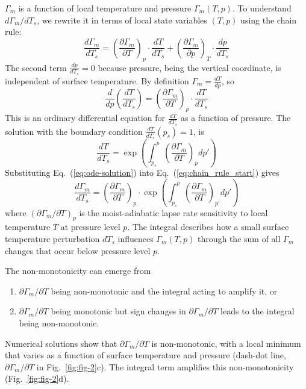 \documentclass[draft]{ametsocV6.1}
\begin{document}
$\Gamma_m$ is a function of local temperature and pressure $\Gamma_m(T, p)$. To understand $d\Gamma_m/dT_s$, we rewrite it in terms of local state variables $(T, p)$ using the chain rule: 
\begin{equation}
\frac{d\Gamma_m}{dT_s} = \left(\frac{\partial\Gamma_m}{\partial T}\right)_p \cdot \frac{dT}{dT_s} + \left(\frac{\partial\Gamma_m}{\partial p}\right)_T \cdot \frac{dp}{dT_s} \label{eq:chain_rule_start}
\end{equation}
The second term $\frac{dp}{dT_s}=0$ because pressure, being the vertical coordinate, is independent of surface temperature. By definition $\Gamma_m = \frac{dT}{dp}$, so
\begin{equation}
    \frac{d}{dp}\left(\frac{dT}{dT_s}\right) = \left(\frac{\partial\Gamma_m}{\partial T}\right)_p \cdot \frac{dT}{dT_s} 
    \label{eq:ode}
\end{equation}
This is an ordinary differential equation for $\frac{dT}{dT_s}$ as a function of pressure. The solution with the boundary condition $\frac{dT}{dT_s}(p_s) = 1$, is
\begin{equation}
    \frac{dT}{dT_s} = \exp\left(\int_{p_s}^{p} \left(\frac{\partial\Gamma_m}{\partial T}\right)_p dp'\right)
    \label{eq:ode-solution}
\end{equation}
Substituting Eq.~(\ref{eq:ode-solution}) into Eq.~(\ref{eq:chain_rule_start}) gives
\begin{equation}
\frac{d\Gamma_m}{dT_s} = \left(\frac{\partial\Gamma_m}{\partial T}\right)_p \cdot \exp\left(\int_{p_s}^{p} \left(\frac{\partial\Gamma_m}{\partial T}\right)_{p'} dp'\right) \label{eq:total_sensitivity}
\end{equation}
where $(\partial\Gamma_m/\partial T)_p$ is the moist-adiabatic lapse rate sensitivity to local temperature $T$ at pressure level $p$. The integral describes how a small surface temperature perturbation $dT_s$ influences $\Gamma_m(T, p)$ through the sum of all $\Gamma_m$ changes that occur below pressure level $p$.

The non-monotonicity can emerge from 
\begin{enumerate}
\item $\partial\Gamma_m/\partial T$ being non-monotonic and the integral acting to amplify it, or 
\item $\partial\Gamma_m/\partial T$ being monotonic but sign changes in $\partial\Gamma_m/\partial T$ leads to the integral being non-monotonic. 
\end{enumerate}
Numerical solutions show that $\partial\Gamma_m/\partial T$ is non-monotonic, with a local minimum that varies as a function of surface temperature and pressure (dash-dot line, $\partial\Gamma_m/\partial T$ in Fig.~\ref{fig:fig-2}c). The integral term amplifies this non-monotonicity (Fig.~\ref{fig:fig-2}d).
\end{document}
